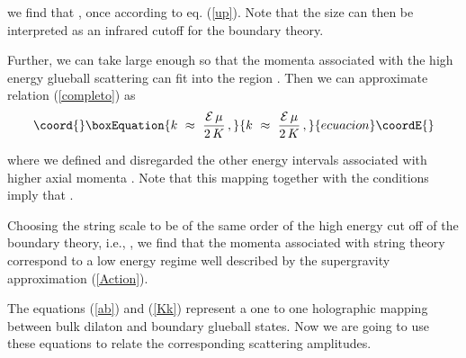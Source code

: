\documentclass[a4paper,twocolumn,prd,groupedaddress,nofootinbib]{revtex4}
\begin{document}
\noindent we find that \coordHE{}, once \coordHE{}
according to eq. (\ref{up}). Note that the size \coordHE{} 
can then be interpreted as
an infrared cutoff for the boundary theory.

Further, we can take  \coordHE{} large enough so that the 
momenta associated with the high energy glueball scattering can 
fit into the region \coordHE{}. 
Then we can  approximate relation (\ref{completo}) as
\begin{equation}\coord{}\boxEquation{
\label{Kk}
k \,\,\approx\,\, { {\cal E}\, \mu  \over 2 \, K}\,, 
}{
k \,\,\approx\,\, { {\cal E}\, \mu  \over 2 \, K}\,, 
}{ecuacion}\coordE{}\end{equation}


\noindent where we defined \coordHE{} and 
disregarded the other energy intervals
associated with higher axial momenta \coordHE{}.
Note that this mapping together with the conditions 
\coordHE{} imply  that \coordHE{}.

Choosing the string scale to  be of the same order of the high 
energy cut off of the boundary theory, i.e., 
\coordHE{},
we find that the momenta \coordHE{} associated with string theory 
correspond to a low energy
regime well described by the supergravity approximation (\ref{Action}).

The equations (\ref{ab}) and (\ref{Kk})  represent a one to one 
holographic mapping
between bulk dilaton  and boundary glueball states.
Now we are going to use these equations to relate the corresponding 
scattering amplitudes.
\end{document}
